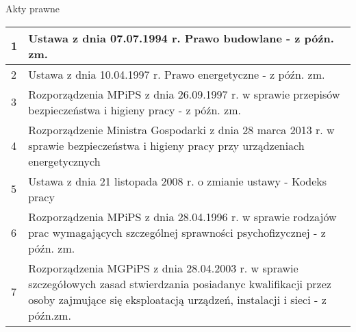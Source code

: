 \pagebreak
Akty prawne \newline
{\scriptsize
    \begin{tabular}{ | p{} | p{} | }
        \hline
        1  & Ustawa z dnia 07.07.1994 r. Prawo budowlane - z późn. zm.                                                                                                                                                                                                                                               \\ \hline
        2  & Ustawa z dnia 10.04.1997 r. Prawo energetyczne - z późn. zm.                                                                                                                                                                                                                                            \\ \hline
        3  & Rozporządzenia MPiPS z dnia 26.09.1997 r. w sprawie przepisów bezpieczeństwa i higieny pracy - z późn. zm.                                                                                                                                                                                              \\ \hline
        4  & Rozporządzenie Ministra Gospodarki z dnia 28 marca 2013 r. w sprawie bezpieczeństwa i higieny pracy przy urządzeniach energetycznych                                                                                                                                                                    \\ \hline
        5  & Ustawa z dnia 21 listopada 2008 r. o zmianie ustawy - Kodeks pracy                                                                                                                                                                                                                                      \\ \hline
        6  & Rozporządzenia MPiPS z dnia 28.04.1996 r. w sprawie rodzajów prac wymagających szczególnej sprawności psychofizycznej - z późn. zm.                                                                                                                                                                     \\ \hline
        7  & Rozporządzenia MGPiPS z dnia 28.04.2003 r. w sprawie szczegółowych zasad stwierdzania posiadanyc kwalifikacji przez osoby zajmujące się eksploatacją urządzeń, instalacji i sieci - z późn.zm.                                                                                                          \\ \hline

\end{tabular}}
